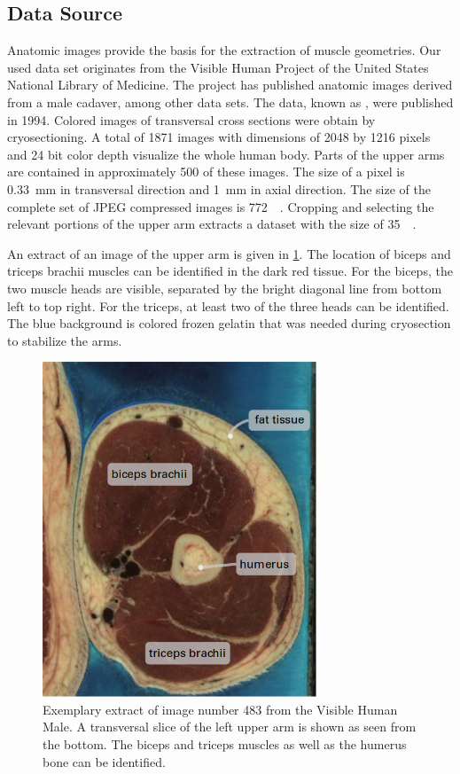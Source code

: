 \subsection{Data Source}
Anatomic images provide the basis for the extraction of muscle geometries.
Our used data set originates from the Visible Human Project \cite{visible_human_male} of 
the United States National Library of Medicine. 
The project has published anatomic images derived from a male cadaver, among other data sets.
The data, known as , were published in 1994.
Colored images of transversal cross sections were obtain by cryosectioning.
A total of \num{1871} images with dimensions of \num{2048} by \num{1216} pixels and 24 bit color depth visualize the whole human body. Parts of the upper arms are contained in approximately 500 of these images. The size of a pixel is \SI{0.33}{\milli\meter} in transversal direction and \SI{1}{\milli\meter} in axial direction. The size of the complete set of JPEG compressed images is \SI{772}{\mega\byte}. Cropping and selecting the relevant portions of the upper arm extracts a dataset with the size of \SI{35}{\mega\byte}.

An extract of an image of the upper arm is given in \cref{fig:vhp_image}. 
The location of biceps and triceps brachii muscles can be identified in the dark red tissue. For the biceps, the two muscle heads are visible, separated by the bright diagonal line from bottom left to top right. For the triceps, at least two of the three heads can be identified. The blue background is colored frozen gelatin that was needed during cryosection to stabilize the arms.

\begin{figure}%
  \centering%
  \includegraphics[height=10cm]{images/fiber_creation/vhp.png}%
  \caption{Exemplary extract of image number 483 from the Visible Human Male. A transversal slice of the left upper arm is shown as seen from the bottom. The biceps and triceps muscles as well as the humerus bone can be identified. }%
  \label{fig:vhp_image}%
\end{figure}%

